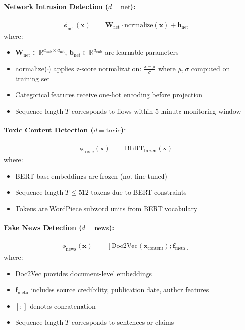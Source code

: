 \documentclass[12pt,a4paper]{article}
\theoremstyle{definition}
\begin{document}
\paragraph{Network Intrusion Detection ($d = \text{net}$):}
\begin{align}
\phi_{\text{net}}(\bm{x}) &= \bm{W}_{\text{net}} \cdot \text{normalize}(\bm{x}) + \bm{b}_{\text{net}}
\end{align}
where:
\begin{itemize}
\item $\bm{W}_{\text{net}} \in \mathbb{R}^{d_{\text{emb}} \times d_{\text{net}}}$, $\bm{b}_{\text{net}} \in \mathbb{R}^{d_{\text{emb}}}$ are learnable parameters
\item normalize($\cdot$) applies z-score normalization: $\frac{x - \mu}{\sigma}$ where $\mu, \sigma$ computed on training set
\item Categorical features receive one-hot encoding before projection
\item Sequence length $T$ corresponds to flows within 5-minute monitoring window
\end{itemize}

\paragraph{Toxic Content Detection ($d = \text{toxic}$):}
\begin{align}
\phi_{\text{toxic}}(\bm{x}) &= \text{BERT}_{\text{frozen}}(\bm{x})
\end{align}
where:
\begin{itemize}
\item BERT-base \citep{devlin2019bert} embeddings are frozen (not fine-tuned)
\item Sequence length $T \leq 512$ tokens due to BERT constraints
\item Tokens are WordPiece subword units from BERT vocabulary
\end{itemize}

\paragraph{Fake News Detection ($d = \text{news}$):}
\begin{align}
\phi_{\text{news}}(\bm{x}) &= [\text{Doc2Vec}(\bm{x}_{\text{content}}); \bm{f}_{\text{meta}}]
\end{align}
where:
\begin{itemize}
\item Doc2Vec provides document-level embeddings
\item $\bm{f}_{\text{meta}}$ includes source credibility, publication date, author features
\item $[;]$ denotes concatenation
\item Sequence length $T$ corresponds to sentences or claims
\end{itemize}
\end{document}

